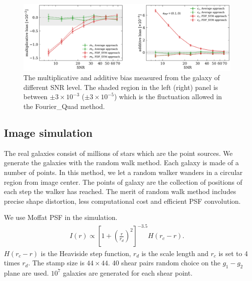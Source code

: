 \documentclass[twocolumn]{aastex62}
\begin{document}
\begin{figure}[htbp]
	\centering
	\includegraphics[width=0.9\linewidth]{figures/pts_sample_mc.pdf}
	\caption{The multiplicative and additive bias measured from the galaxy of different SNR level. The shaded region in the left (right) panel is between $\pm 3\times 10^{-3}$ ($\pm 3\times10^{-5}$) which is the fluctuation allowed in the Fourier\_Quad method. }\label{fig:pts_mc}
\end{figure}

\subsection{Image simulation}
The real galaxies consist of millions of stars which are the point sources. We generate the galaxies with the random walk method. Each galaxy is made of a number of points. In this method, we let a random walker wanders in a circular region from image center. The points of galaxy are the collection of positions of each step the walker has reached. The merit of random walk method includes precise shape distortion, less computational cost and efficient PSF convolution.

We use Moffat PSF in the simulation. 
\begin{eqnarray}
I(r) \propto \left[1+\left(\frac{r}{r_d}\right)^2\right]^{-3.5}H(r_c-r).
\end{eqnarray}
$H(r_c-r)$ is the Heaviside step function, $r_d$ is the scale length and $r_c$ is set to 4 times $r_d$. The stamp size is $44\times44$. 40 shear pairs random choice on the $g_1-g_2$ plane are used. $10^7$ galaxies are generated for each shear point.
\end{document}
